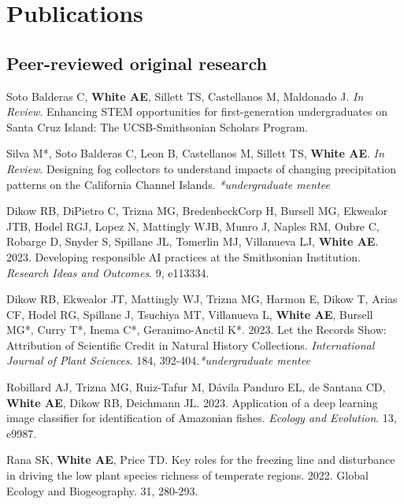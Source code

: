 \documentclass[letterpaper]{article}
\newenvironment{biblist}{%
   \begin{list}{}{%
     \setlength{\labelwidth}{0pt}%
     \setlength{\labelsep}{1em}%
     \setlength{\leftmargin}{2em}%
     \setlength{\itemindent}{-1em}%
   }
}{\end{list}}
\begin{document}
\section*{Publications}
\subsection*{Peer-reviewed original research}
\begin{biblist} 
\item Soto Balderas C, \textbf{White AE}, Sillett TS, Castellanos M, Maldonado J. \textit{In Review}. Enhancing STEM opportunities for first-generation undergraduates on Santa Cruz Island: The UCSB-Smithsonian Scholars Program. 

\item Silva M*, Soto Balderas C, Leon B, Castellanos M, Sillett TS, \textbf{White AE}. \textit{In Review}. Designing fog collectors to understand impacts of changing precipitation patterns on the California Channel Islands. \textit{*undergraduate mentee}

\item Dikow RB, DiPietro C, Trizna MG, BredenbeckCorp H, Bursell MG, Ekwealor JTB, Hodel RGJ, Lopez N, Mattingly WJB, Munro J, Naples RM, Oubre C, Robarge D, Snyder S, Spillane JL, Tomerlin MJ, Villanueva LJ, \textbf{White AE}. 2023. Developing responsible AI practices at the Smithsonian Institution. \textit{Research Ideas and Outcomes}. 9, e113334.

\item Dikow RB, Ekwealor JT, Mattingly WJ, Trizna MG, Harmon E, Dikow T, Arias CF, Hodel RG, Spillane J, Tsuchiya MT, Villanueva L, \textbf{White AE}, Bursell MG*, Curry T*, Inema C*, Geranimo-Anctil K*. 2023. Let the Records Show: Attribution of Scientific Credit in Natural History Collections. \textit{International Journal of Plant Sciences}. 184, 392-404.\textit{*undergraduate mentee}

\item Robillard AJ, Trizna MG, Ruiz‐Tafur M, Dávila Panduro EL, de Santana CD, \textbf{White AE}, Dikow RB, Deichmann JL. 2023. Application of a deep learning image classifier for identification of Amazonian fishes. \textit{Ecology and Evolution}. 13, e9987.

\item Rana SK, \textbf{White AE}, Price TD. Key roles for the freezing line and disturbance in driving the low plant species richness of temperate regions. 2022. Global Ecology and Biogeography. 31, 280-293.


\end{biblist}
\end{document}
